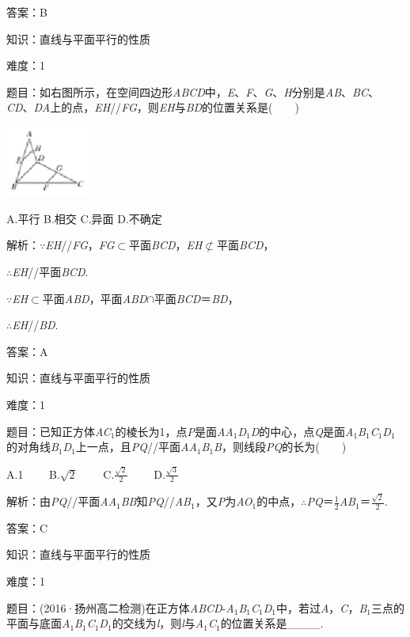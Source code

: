 \documentclass{article} %
\begin{document}
答案：B

知识：直线与平面平行的性质

难度：1

题目：如右图所示，在空间四边形\textit{ABCD}中，\textit{E}、\textit{F}、\textit{G}、\textit{H}分别是\textit{AB}、\textit{BC}、\textit{CD}、\textit{DA}上的点，\textit{EH}//\textit{FG}，则\textit{EH}与\textit{BD}的位置关系是(　　)

\includegraphics*[width=1.08in, height=0.92in, keepaspectratio=false]{image162}

A.平行 B.相交 C.异面 D.不确定

解析：$\mathrm{\because}$\textit{EH}//\textit{FG}，\textit{FG}$\mathrm{\subset }$平面\textit{BCD}，\textit{EH}$\mathrm{\nsubset}$平面\textit{BCD}，

$\mathrm{\therefore}$\textit{EH}//平面\textit{BCD}.

$\mathrm{\because}$\textit{EH}$\mathrm{\subset }$平面\textit{ABD}，平面\textit{ABD}$\mathrm{\cap}$平面\textit{BCD}＝\textit{BD}，

$\mathrm{\therefore}$\textit{EH}//\textit{BD}.

答案：A

知识：直线与平面平行的性质

难度：1

题目：已知正方体\textit{AC}${}_{1}$的棱长为1，点\textit{P}是面\textit{AA}${}_{1}$\textit{D}${}_{1}$\textit{D}的中心，点\textit{Q}是面\textit{A}${}_{1}$\textit{B}${}_{1}$\textit{C}${}_{1}$\textit{D}${}_{1}$的对角线\textit{B}${}_{1}$\textit{D}${}_{1}$上一点，且\textit{PQ}//平面\textit{AA}${}_{1}$\textit{B}${}_{1}$\textit{B}，则线段\textit{PQ}的长为(　　)

A.1　　 B.$\sqrt{2}$　　 C.$\frac{\sqrt{2}}{2}$　　 D.$\frac{\sqrt{3}}{2}$

解析：由\textit{PQ}//平面\textit{AA}${}_{1}$\textit{BB}知\textit{PQ}//\textit{AB}${}_{1}$，又\textit{P}为\textit{AO}${}_{1}$的中点，$\mathrm{\therefore}$\textit{PQ}＝$\frac{1}{2}$\textit{AB}${}_{1}$＝$\frac{\sqrt{2}}{2}$.

答案：C

知识：直线与平面平行的性质

难度：1

题目：(2016·扬州高二检测)在正方体\textit{ABCD}-\textit{A}${}_{1}$\textit{B}${}_{1}$\textit{C}${}_{1}$\textit{D}${}_{1}$中，若过\textit{A}，\textit{C}，\textit{B}${}_{1}$三点的平面与底面\textit{A}${}_{1}$\textit{B}${}_{1}$\textit{C}${}_{1}$\textit{D}${}_{1}$的交线为\textit{l}，则\textit{l}与\textit{A}${}_{1}$\textit{C}${}_{1}$的位置关系是\_\_\_\_.
\end{document}
